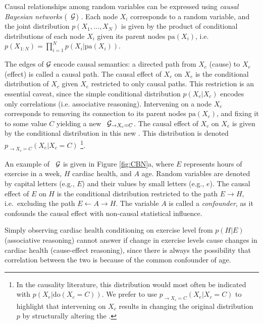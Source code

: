 Causal relationships among random variables can be expressed using \emph{causal Bayesian networks} (\CBNs~${\cal G}$)  \citep{pearl2000,spirtes2000causation,dawid07fundamentals}. Each node $X_i$ corresponds to a random variable, and the joint distribution $p(X_1, \ldots, X_N)$ is given by the product of conditional distributions of each node $X_i$ given its parent nodes $\textrm{pa}(X_i)$, i.e.~$p(X_{1:N})=\prod_{i=1}^Np(X_i|\textrm{pa}(X_i))$. 

The edges of ${\cal G}$ encode causal semantics: a directed path from $X_c$ (cause) to $X_e$ (effect) is called a causal path. The causal effect of $X_c$ on $X_e$ is the conditional distribution of $X_c$ given $X_e$ restricted to only causal paths. This restriction is an essential caveat, since the simple conditional distribution \(p(X_e|X_c)\) encodes only correlations (i.e. associative reasoning). Intervening on a node $X_c$ corresponds to removing its connection to its parent nodes  $\textrm{pa}(X_c)$, and fixing it to some value $C$ yielding a new \CBN~${\cal G}_{\rightarrow X_c = C}$. The causal effect of $X_c$ on $X_e$ is given by the conditional distribution in this new \CBN. This distribution is denoted $p_{\rightarrow X_c = C}(X_e|X_c = C)$
\footnote{In the causality literature, this distribution would most often be indicated with $p(X_e|\textrm{do}(X_c = C))$. We prefer to use $p_{\rightarrow X_c = C}(X_e|X_c = C)$ to highlight that intervening on $X_c$ results in changing the original distribution $p$ by structurally altering the \CBN.}. 

An example of \CBN~${\cal G}$ is given in Figure \ref{fig:CBN}a, where $E$ represents hours of exercise in a week, $H$ cardiac health, and $A$ age. 
Random variables are denoted by capital letters (e.g., $E$) and their values by small letters (e.g., $e$). The causal effect of $E$ on $H$ is the conditional distribution restricted to the path $E\rightarrow H$, i.e.~excluding the path $E\leftarrow A \rightarrow H$. The variable $A$ is called a \emph{confounder}, as it confounds the causal effect with non-causal statistical influence. 

Simply observing cardiac health conditioning on exercise level from $p(H|E)$ (associative reasoning) cannot answer if change in exercise levels cause changes in cardiac health (cause-effect reasoning), since there is always the possibility that correlation between the two is because of the common confounder of age. 

